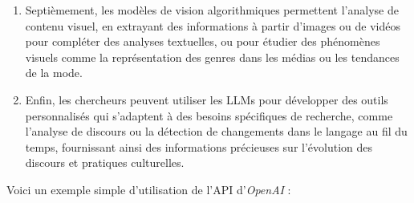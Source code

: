 \documentclass[
  letterpaper,
  DIV=11,
  numbers=noendperiod,
  oneside]{scrreprt}
\newenvironment{Shaded}{\begin{snugshade}}{\end{snugshade}}
\newcommand{\AttributeTok}[1]{\textcolor[rgb]{0.40,0.45,0.13}{#1}}
\newcommand{\CommentTok}[1]{\textcolor[rgb]{0.37,0.37,0.37}{#1}}
\newcommand{\FunctionTok}[1]{\textcolor[rgb]{0.28,0.35,0.67}{#1}}
\newcommand{\NormalTok}[1]{\textcolor[rgb]{0.00,0.23,0.31}{#1}}
\newcommand{\OtherTok}[1]{\textcolor[rgb]{0.00,0.23,0.31}{#1}}
\newcommand{\SpecialCharTok}[1]{\textcolor[rgb]{0.37,0.37,0.37}{#1}}
\newcommand{\StringTok}[1]{\textcolor[rgb]{0.13,0.47,0.30}{#1}}
\begin{document}
\begin{enumerate}
  comme des entrevues, facilitant l'analyse de discours oraux ou de
  conversations enregistrées, et permettant aux chercheurs de travailler
  avec des données multimodales pour des études interdisciplinaires.
\item
  Septièmement, les modèles de vision algorithmiques permettent
  l'analyse de contenu visuel, en extrayant des informations à partir
  d'images ou de vidéos pour compléter des analyses textuelles, ou pour
  étudier des phénomènes visuels comme la représentation des genres dans
  les médias ou les tendances de la mode.
\item
  Enfin, les chercheurs peuvent utiliser les LLMs pour développer des
  outils personnalisés qui s'adaptent à des besoins spécifiques de
  recherche, comme l'analyse de discours ou la détection de changements
  dans le langage au fil du temps, fournissant ainsi des informations
  précieuses sur l'évolution des discours et pratiques culturelles.
\end{enumerate}

Voici un exemple simple d'utilisation de l'API d'\emph{OpenAI} :

\begin{Shaded}
\end{Shaded}
\end{document}
